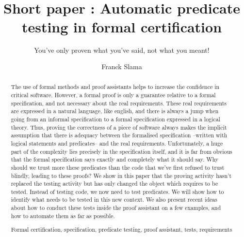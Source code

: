 \documentclass[runningheads,a4paper]{llncs}
\newcommand{\keywords}[1]{\par\addvspace\baselineskip
\noindent\keywordname\enspace\ignorespaces#1}
\begin{document}
\mainmatter  %

\title{Short paper : Automatic predicate testing in formal certification}
\subtitle{You've only proven what you've said, not what you meant!}



\author{Franck Slama\\
         }


\maketitle


\begin{abstract}
The use of formal methods and proof assistants helps to increase the confidence in critical software. However, a formal proof is only a guarantee relative to a formal specification, and not necessary about the real requirements. These real requirements are expressed in a natural language, like english, and there is always a jump when going from an informal specification to a formal specification expressed in a logical theory. Thus, proving the correctness of a piece of software always makes the implicit assumption that there is adequacy between the formalised specification --written with logical statements and predicates-- and the real requirements. Unfortunately, a huge part of the complexity lies precisely in the specification itself, and it is far from obvious that the formal specification says exactly and completely what it should say. Why should we trust more these predicates than the code that we've first refused to trust blindly, leading to these proofs? We show in this paper that the proving activity hasn't replaced the testing activity but has only changed the object which requires to be tested. Instead of testing code, we now need to test predicates. We will show how to identify what needs to be tested in this new context. We also present recent ideas about how to conduct these tests inside the proof assistant on a few examples, and how to automate them as far as possible.

\keywords{Formal certification, specification, predicate testing, proof assistant, tests, requirements}
\end{abstract}




















\end{document}

